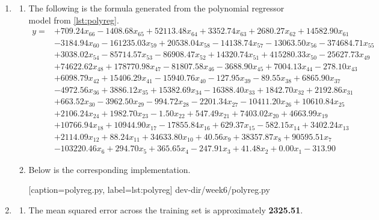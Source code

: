 \documentclass{article}
\begin{document}
\begin{enumerate}[leftmargin={*}, font={\bf}, label={\arabic*.}, ref={\arabic*}]
\begin{enumerate}[label={(\Alph*)}, ref={\theenumi(\Alph*)}]
      \item \label{qst:1C}
        \begin{enumerate}[label={(\roman*)}, ref={\theenumii(\roman*)}]
          \item
            The following is the formula generated from the polynomial regressor
            model from \autoref{lst:polyreg}.
            \begin{align*}
              y = &+709.24x_{66} − 1408.68x_{65} + 52113.48x_{64} + 3352.74x_{63} + 2680.27x_{62} + 14582.90x_{61} \\
                  &-3184.94x_{60} - 161235.03x_{59} + 20538.04x_{58} - 14138.74x_{57} - 13063.50x_{56} - 374684.71x_{55} \\
                  &+3038.02x_{54} - 85714.57x_{53} - 86908.47x_{52} + 14320.74x_{51} + 415280.33x_{50} - 25627.73x_{49} \\
                  &+74622.62x_{48} + 178770.98x_{47} − 81807.58x_{46} - 3688.90x_{45} + 7004.13x_{44} - 278.10x_{43} \\
                  &+6098.79x_{42} + 15406.29x_{41} - 15940.76x_{40} - 127.95x_{39} - 89.55x_{38} + 6865.90x_{37} \\
                  &-4972.56x_{36} + 3886.12x_{35} + 15382.69x_{34} - 16388.40x_{33} + 1842.70x_{32} + 2192.86x_{31} \\
                  &+663.52x_{30} - 3962.50x_{29} - 994.72x_{28} - 2201.34x_{27} - 10411.20x_{26} + 10610.84x_{25} \\
                  &+2106.24x_{24} + 1982.70x_{23} - 1.50x_{22} + 547.49x_{21} + 7403.02x_{20} + 4663.99x_{19} \\
                  &+10766.94x_{18} + 10944.90x_{17} - 17855.84x_{16} + 629.37x_{15} - 582.15x_{14} + 3402.24x_{13} \\
                  &+2114.09x_{12} + 88.24x_{11} + 34633.80x_{10} + 40.56x_9 + 38357.87x_8 + 90595.51x_7 \\
                  &-103220.46x_6 + 294.70x_5 + 365.65x_4 - 247.91x_3 + 41.48x_2 + 0.00x_1 - 313.90
            \end{align*}
            
          \item
            Below is the corresponding implementation.
            
              [caption={\sf polyreg.py}, label={lst:polyreg}]
              {dev-dir/week6/polyreg.py}
        \end{enumerate}
        
      \item \label{qst:1D}
        \begin{enumerate}[label={(\roman*)}, ref={\theenumii(\roman*)}]
          \item
            The mean squared error across the training set is approximately {\bf
            2325.51}.
          

\end{enumerate}
\end{enumerate}
\end{enumerate}
\end{document}
